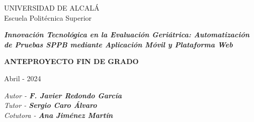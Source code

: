 \documentclass[12pt,oneside,a4paper]{article}
\begin{document}

\thispagestyle{empty}

\begin{center}

\begin{large}
UNIVERSIDAD DE ALCALÁ\\
Escuela Politécnica Superior\\
\end{large}
\vspace{4cm}


\begin{spacing}{2} %
\begin{Huge}\textbf{\textit{Innovación Tecnológica en la Evaluación Geriátrica: Automatización de Pruebas SPPB mediante Aplicación Móvil y Plataforma Web}}\end{Huge}
\end{spacing}



\vspace{1cm}


\textbf{ANTEPROYECTO FIN DE GRADO}

\vfill
\hline
Abril - 2024

\end{center}

\begin{flushright}
\textit{Autor - \textbf{F. Javier Redondo García}} \\
\textit{Tutor - \textbf{Sergio Caro Álvaro}} \\
\textit{Cotutora - \textbf{Ana Jiménez Martín}}

\end{flushright}
\end{document}
